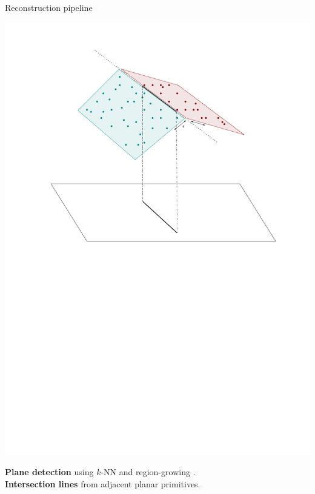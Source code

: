 \begin{frame}{Reconstruction pipeline}
	\scriptsize
	
	\begin{minipage}{0.30\linewidth}
		\centering
		\includegraphics[width=\linewidth]{plane_detection}
	\end{minipage}
	\hfill
	\begin{minipage}{0.6\linewidth}
		\textbf{Plane detection} using $k$-NN and region-growing \cite{feng_FastPlaneExtraction_2014, rabbani_SegmentationPointClouds_2006}.\\
		\textbf{Intersection lines} from adjacent planar primitives.
	\end{minipage}
	
	\vspace{0.25cm}
	

\end{frame}
